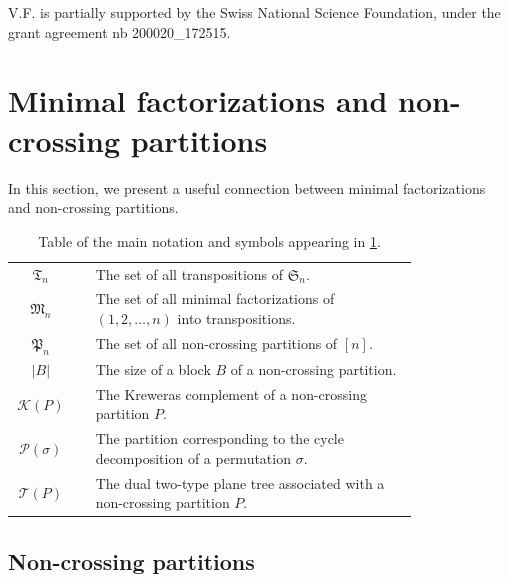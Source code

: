 \documentclass[10pt]{amsart}
\theoremstyle{definition}\newtheorem{defi}[theo]{Definition}\newtheorem{rema}[theo]{Remark}\newtheorem{exam}[theo]{Example}\newtheorem{exem}[theo]{Example}\newtheorem{nota}[theo]{Notation}
\def\PPP{\mathcal P}
\begin{document}
V.F. is partially supported by the Swiss National Science Foundation, under
the grant agreement nb 200020\_172515.

\setcounter{tocdepth}{2}
\tableofcontents



\section{Minimal factorizations and non-crossing partitions}
\label{sec:ncp}

In this section, we present a useful connection between minimal factorizations and non-crossing partitions.


\begin{table}[htbp]\caption{Table of the main notation and symbols appearing in \cref{sec:ncp}.}
\centering
\begin{tabular}{c c p{0.8\linewidth} }
\toprule
$\mathfrak{T}_{n}$ & & The set of all transpositions of $\mathfrak{S}_{n}$. \\
$\mathfrak{M}_{n}$ & & The set of all minimal factorizations of  $(1,2, \ldots,n)$ into transpositions. \\
$\mathfrak{P}_{n}$ & & The set of all non-crossing partitions of $[n]$. \\
$|B|$ & & The size of a block $B$ of a non-crossing partition. \\
$ \mathcal{K}(P)$ &  & The Kreweras complement of a non-crossing partition $P$.\\
$\PPP(\sigma)$ & & The partition corresponding to the cycle decomposition of a permutation $\sigma$.\\
$ \mathcal{T}(P)$ & & The dual two-type plane tree  associated with a non-crossing partition $P$. \\
\bottomrule
\end{tabular}
\label{tab:secncp}
\end{table}




\subsection{Non-crossing partitions}
\label{ssec:ncp}
\end{document}
